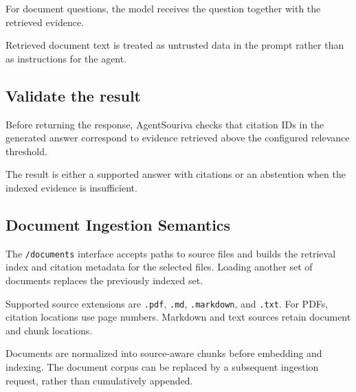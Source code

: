 For document questions, the model receives the question together with the retrieved evidence.

Retrieved document text is treated as untrusted data in the prompt rather than as instructions for the agent.

\subsection{Validate the result}

Before returning the response, AgentSouriva checks that citation IDs in the generated answer correspond to evidence retrieved above the configured relevance threshold.

The result is either a supported answer with citations or an abstention when the indexed evidence is insufficient.

\subsection{Document Ingestion Semantics}

The \texttt{/documents} interface accepts paths to source files and builds the retrieval index and citation metadata for the selected files. Loading another set of documents replaces the previously indexed set.

Supported source extensions are \texttt{.pdf}, \texttt{.md}, \texttt{.markdown}, and \texttt{.txt}. For PDFs, citation locations use page numbers. Markdown and text sources retain document and chunk locations.

Documents are normalized into source-aware chunks before embedding and indexing. The document corpus can be replaced by a subsequent ingestion request, rather than cumulatively appended.


